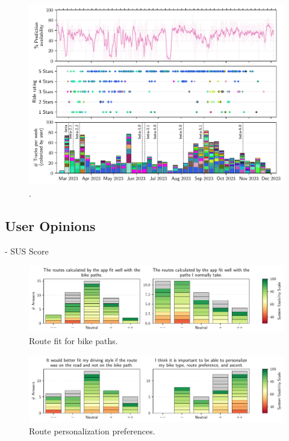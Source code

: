 \begin{figure}[t]
\caption{.}\label{fig:}
\includegraphics[width=\linewidth]{images/app-usage-over-time.pdf}
\end{figure}

\subsection{User Opinions}

- SUS Score

\begin{figure}[t]
\caption{Route fit for bike paths.}\label{fig:route-fit-bike-paths}
\includegraphics[width=\linewidth]{images/app-usability-questions-route-fit-bike-paths.pdf}
\end{figure}

\begin{figure}[t]
\caption{Route personalization preferences.}\label{fig:route-personalization}
\includegraphics[width=\linewidth]{images/app-usability-questions-route-personalization.pdf}
\end{figure}
          

